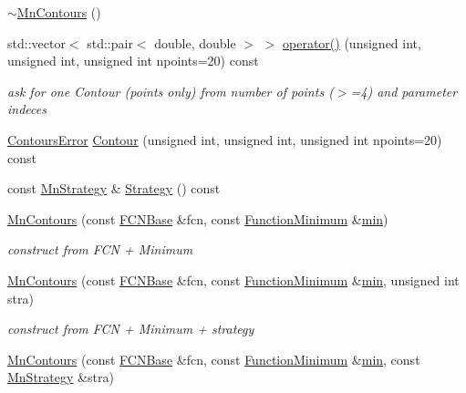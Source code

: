 \begin{DoxyCompactItemize}
\mbox{\hyperlink{classROOT_1_1Minuit2_1_1MnContours_a0764759095adb2129ae9282024af472a}{$\sim$\+Mn\+Contours}} ()
\item 
std\+::vector$<$ std\+::pair$<$ double, double $>$ $>$ \mbox{\hyperlink{classROOT_1_1Minuit2_1_1MnContours_a8a56508ee3dd6f22b7378acf8286debe}{operator()}} (unsigned int, unsigned int, unsigned int npoints=20) const
\begin{DoxyCompactList}\small\item\em ask for one Contour (points only) from number of points ($>$=4) and parameter indeces \end{DoxyCompactList}\item 
\mbox{\hyperlink{classROOT_1_1Minuit2_1_1ContoursError}{Contours\+Error}} \mbox{\hyperlink{classROOT_1_1Minuit2_1_1MnContours_a8bcd5be6a72acc39c1b56fd45e9958ba}{Contour}} (unsigned int, unsigned int, unsigned int npoints=20) const
\item 
const \mbox{\hyperlink{classROOT_1_1Minuit2_1_1MnStrategy}{Mn\+Strategy}} \& \mbox{\hyperlink{classROOT_1_1Minuit2_1_1MnContours_a79b55e1c06425b314701c4a3e5b7b009}{Strategy}} () const
\item 
\mbox{\hyperlink{classROOT_1_1Minuit2_1_1MnContours_a87d983509ac3ce6f6635407a81e07153}{Mn\+Contours}} (const \mbox{\hyperlink{classROOT_1_1Minuit2_1_1FCNBase}{F\+C\+N\+Base}} \&fcn, const \mbox{\hyperlink{classROOT_1_1Minuit2_1_1FunctionMinimum}{Function\+Minimum}} \&\mbox{\hyperlink{SU3__internal_8h_ab0f5fed3171eb00d1c5f037d9f518a23}{min}})
\begin{DoxyCompactList}\small\item\em construct from F\+CN + Minimum \end{DoxyCompactList}\item 
\mbox{\hyperlink{classROOT_1_1Minuit2_1_1MnContours_af56ce1293967140b9ee0ea0b30fad690}{Mn\+Contours}} (const \mbox{\hyperlink{classROOT_1_1Minuit2_1_1FCNBase}{F\+C\+N\+Base}} \&fcn, const \mbox{\hyperlink{classROOT_1_1Minuit2_1_1FunctionMinimum}{Function\+Minimum}} \&\mbox{\hyperlink{SU3__internal_8h_ab0f5fed3171eb00d1c5f037d9f518a23}{min}}, unsigned int stra)
\begin{DoxyCompactList}\small\item\em construct from F\+CN + Minimum + strategy \end{DoxyCompactList}\item 
\mbox{\hyperlink{classROOT_1_1Minuit2_1_1MnContours_a8f75794bb66e605caabac79cf7a32c77}{Mn\+Contours}} (const \mbox{\hyperlink{classROOT_1_1Minuit2_1_1FCNBase}{F\+C\+N\+Base}} \&fcn, const \mbox{\hyperlink{classROOT_1_1Minuit2_1_1FunctionMinimum}{Function\+Minimum}} \&\mbox{\hyperlink{SU3__internal_8h_ab0f5fed3171eb00d1c5f037d9f518a23}{min}}, const \mbox{\hyperlink{classROOT_1_1Minuit2_1_1MnStrategy}{Mn\+Strategy}} \&stra)

\end{DoxyCompactItemize}
